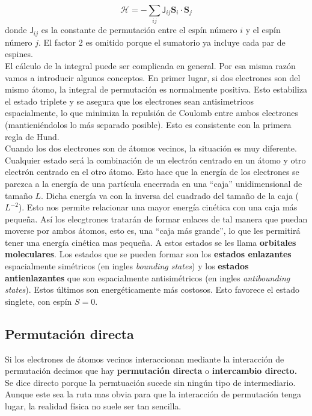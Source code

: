 \documentclass[12pt,a4paper]{book}
\numberwithin{equation}{section}
\numberwithin{figure}{section}
\newcommand{\Hcal}{\mathcal{H}}
\newcommand{\Jsf}{\mathsf{J}}
\newcommand{\Sn}{\mathbf{S}}
\begin{document}
\begin{equation}
    \Hcal =- \sum_{ij} \Jsf_{ij} \Sn_i \cdot \Sn_j \label{Ec:04-02-005}
\end{equation}
donde $\Jsf_{ij}$ es la constante de permutación entre el espín número $i$ y el espín número $j$. El factor 2 es omitido porque el sumatorio ya incluye cada par de espines. \\

El cálculo de la integral puede ser complicada en general. Por esa misma razón vamos a introducir algunos conceptos. En primer lugar, si dos electrones son del mismo átomo, la integral de permutación es normalmente positiva. Esto estabiliza el estado triplete y se asegura que los electrones sean antisimetricos espacialmente, lo que minimiza la repulsión de Coulomb entre ambos electrones (mantieniéndolos lo más separado posible). Esto es consistente con la primera regla de Hund. \\

Cuando los dos electrones son de átomos vecinos, la situación es muy diferente. Cualquier estado será la combinación de un electrón centrado en un átomo y otro electrón centrado en el otro átomo. Esto hace que la energía de los electrones se parezca a la energía de una partícula encerrada en una ``caja'' unidimensional de tamaño $L$. Dicha energía va con la inversa del cuadrado del tamaño de la caja ($L^{-2}$). Esto nos permite relacionar una mayor energía cinética con una caja más pequeña. Así los elecgtrones tratarán de formar enlaces de tal manera que puedan moverse por ambos átomos, esto es, una ``caja más grande'', lo que les permitirá tener una energía cinética mas pequeña. A estos estados se les llama \textbf{orbitales moleculares}. Los estados que se pueden formar son los \textbf{estados enlazantes} espacialmente simétricos (en ingles \textit{bounding states}) y los \textbf{estados antienlazantes} que son espacialmente antisimétricos (en ingles \textit{antibounding states}). Estos últimos son energéticamente más costosos. Esto favorece el estado singlete, con espín $S=0$.

\subsection{Permutación directa}

Si los electrones de átomos vecinos interaccionan mediante la interacción de permutación decimos que hay \textbf{permutación directa} o \textbf{intercambio directo.} Se dice directo porque la permtuación sucede sin ningún tipo de intermediario. Aunque este sea la ruta mas obvia para que la interacción de permutación tenga lugar, la realidad física no suele ser tan sencilla. \\
\end{document}
